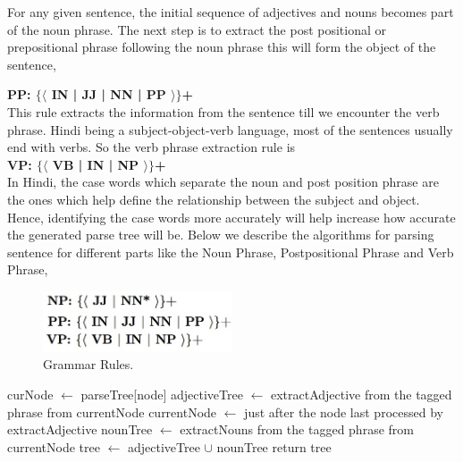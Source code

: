 For any given sentence, the initial sequence of adjectives and nouns becomes part of the noun phrase. The next step is to extract the post positional or prepositional phrase following the noun phrase this will form the object of the sentence,

\textbf {PP: $\{ \langle$ IN | JJ | NN | PP $\rangle \}$+} \\

This rule extracts the information from the sentence till we encounter the verb phrase. Hindi being a subject-object-verb language, most of the sentences usually end with verbs. So the verb phrase extraction rule is \\

\textbf {VP: $\{ \langle$ VB | IN | NP $\rangle \}$+} \\

In Hindi, the case words which separate the noun and post position phrase are the ones which help define the relationship between the subject and object. Hence, identifying the case words more accurately will help increase how accurate the generated parse tree will be. Below we describe the algorithms for parsing sentence for different parts like the Noun Phrase, Postpositional Phrase and Verb Phrase,

\begin{figure}[htb]
\centering
\includegraphics[width=0.5\textwidth]{images/gammarrules.jpg}
\caption{Grammar Rules.} 
\label{fig:gammarrules}
\end{figure}

\begin {algorithm}
\caption {Extract Noun Phrase}
\begin {algorithmic}[1]
\State curNode $\gets$ parseTree[node]
\State adjectiveTree $\gets$ extractAdjective from the tagged phrase from currentNode
\State currentNode $\gets$ just after the node last processed by extractAdjective
\State nounTree $\gets$ extractNouns from the tagged phrase from currentNode
\State tree $\gets$ adjectiveTree $\cup$ nounTree 
\State return tree
\EndProcedure		
\end {algorithmic}
\end {algorithm}

